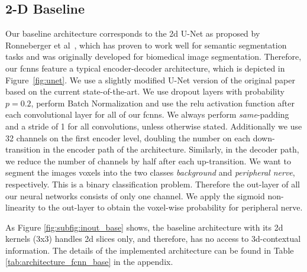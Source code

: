 \subsection{2-D Baseline}
Our baseline architecture corresponds to the \gls{2d} U-Net as proposed by Ronneberger et al~\cite{Ronneberger2015U-Net:Segmentation}, which has proven to work well for semantic segmentation tasks and was originally developed for biomedical image segmentation. Therefore, our \gls{fcnn}s feature a typical encoder-decoder architecture, which is depicted in Figure~\ref{fig:unet}. We use a slightly modified U-Net version of the original paper based on the current state-of-the-art. We use dropout layers \cite{Srivastava2014Dropout:Overfitting} with probability $p = 0.2$, perform Batch Normalization \cite{SergeyIoffe2015BatchNormalization} and use the \gls{relu} activation function after each convolutional layer for all of our \gls{fcnn}s. We always perform \textit{same}-padding and a stride of 1 for all convolutions, unless otherwise stated. Additionally we use 32 channels on the first encoder level, doubling the number on each down-transition in the encoder path of the architecture.
Similarly, in the decoder path, we reduce the number of channels by half after each up-transition. We want to segment the images voxels into the two classes \textit{background} and \textit{peripheral nerve}, respectively. This is a binary classification problem. Therefore the out-layer of all our neural networks consists of only one channel. We apply the sigmoid non-linearity to the out-layer to obtain the voxel-wise probability for peripheral nerve.

As Figure \ref{fig:subfig:inout_base} shows, the baseline architecture with its \gls{2d} kernels (3x3) handles \gls{2d} slices only, and therefore, has no access to \gls{3d}-contextual information. The details of the implemented architecture can be found in Table \ref{tab:architecture_fcnn_base} in the appendix.

